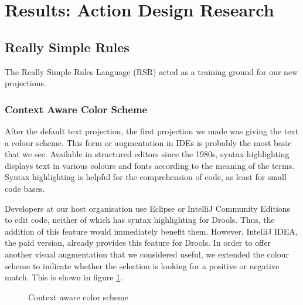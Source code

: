 \section{Results: Action Design Research}\label{section:Results_ADR}

\subsection{Really Simple Rules}

The Really Simple Rules Language (RSR) acted as a training ground for our new projections.

\subsubsection{Context Aware Color Scheme}
After the default text projection, the first projection we made was giving the text a colour scheme.
This form or augmentation in IDEs is probably the most basic that we see.
Available in structured editors since the 1980s\cite{cowlishaw1987lexx}, syntax highlighting displays text in various colours and fonts according to the meaning of the terms.
Syntax highlighting is helpful for the comprehension of code, as least for small code bases\cite{sarkar2015impact}.

Developers at our host organisation use Eclipse or IntelliJ Community Editions to edit code, neither of which has syntax highlighting for Drools. Thus, the addition of this feature would immediately benefit them.
However, IntelliJ IDEA, the paid version, already provides this feature for Drools.
In order to offer another visual augmentation that we considered useful, we extended the colour scheme to indicate whether the selection is looking for a positive or negative match.
This is shown in figure \ref{fig:colorscheme}.

\begin{figure}[h]
    \centering
    \caption{Context aware color scheme}
    \label{fig:colorscheme}
\end{figure}

